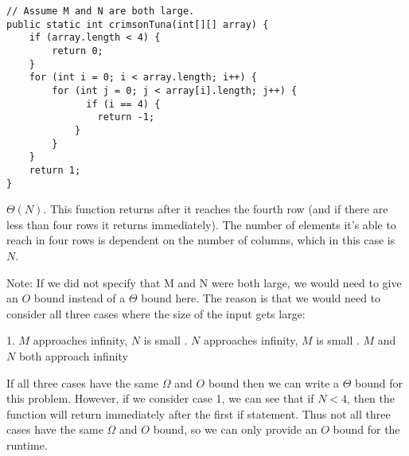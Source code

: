 \begin{blocksection}
\question

\begin{lstlisting}
// Assume M and N are both large.
public static int crimsonTuna(int[][] array) {
    if (array.length < 4) {
        return 0;
    }
    for (int i = 0; i < array.length; i++) {
        for (int j = 0; j < array[i].length; j++) {
              if (i == 4) {
                return -1;
            }
        }
    }
    return 1;
}
\end{lstlisting}
\end{blocksection}

\begin{blocksection}
\begin{solution}
$\Theta(N)$. This function returns after it reaches the fourth row (and if there are
less than four rows it returns immediately). The number of elements it's able
to reach in four rows is dependent on the number of columns, which in this case
is $N$. \newline

Note: If we did not specify that M and N were both large, we would need to give an
$O$ bound instead of a $\Theta$ bound here. The reason is that we would need to
consider all three cases where the size of the input gets large: \newline 

1. $M$ approaches infinity, $N$ is small . $N$ approaches infinity, $M$ is small . $M$ and $N$ both approach infinity \newline

If all three cases have the same $\Omega$ and $O$ bound then we can write a
$\Theta$ bound for this problem. However, if we consider case 1, we can see
that if $N < 4$, then the function will return immediately after the first
if statement. Thus not all three cases have the same  $\Omega$ and $O$ bound,
so we can only provide an $O$ bound for the runtime.
\end{solution}
\end{blocksection}
